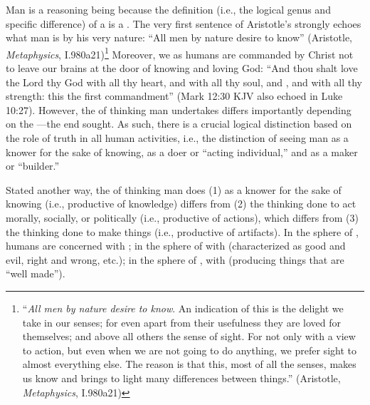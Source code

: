 Man is a reasoning being because the definition (i.e., the logical genus and specific difference) of a  is a . The very first sentence of Aristotle's  strongly echoes what man is by his very nature: ``All men by nature desire to know'' (Aristotle, \textit{Metaphysics}, I.980a21)\footnote{``\emph{All men by nature desire to know}. An indication of this is the delight we take in our senses; for even apart from their usefulness they are loved for themselves; and above all others the sense of sight. For not only with a view to action, but even when we are not going to do anything, we prefer sight to almost everything else. The reason is that this, most of all the senses, makes us know and brings to light many differences between things.'' (Aristotle, \textit{Metaphysics}, I.980a21)} Moreover, we as humans are commanded by Christ not to leave our brains at the door of knowing and loving God: ``And thou shalt love the Lord thy God with all thy heart, and with all thy soul, and , and with all thy strength: this  the first commandment'' (Mark 12:30 KJV also echoed in Luke 10:27). However, the  of thinking man undertakes differs importantly depending on the ---the end sought. As such, there is a crucial logical distinction based on the role of truth in all human activities, i.e., the distinction of seeing man as a knower for the sake of knowing, as a doer or ``acting individual,'' and as a maker or ``builder.''

Stated another way, the  of thinking man does (1) as a knower for the sake of knowing (i.e., productive of knowledge) differs from (2) the thinking done to act morally, socially, or politically (i.e., productive of actions), which differs from (3) the thinking done to make things (i.e., productive of artifacts). In the sphere of , humans are concerned with ; in the sphere of  with  (characterized as good and evil, right and wrong, etc.); in the sphere of , with  (producing things that are ``well made'').


